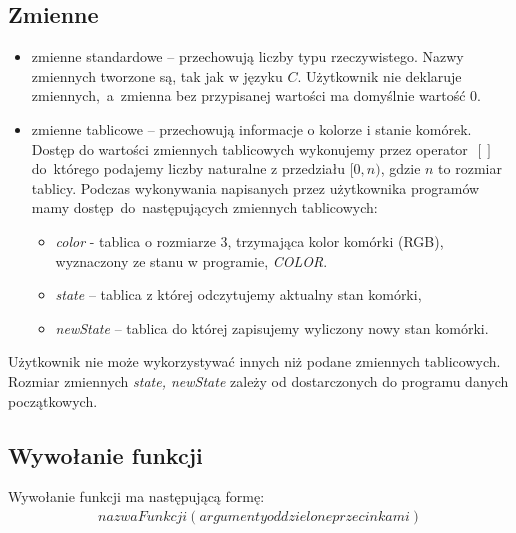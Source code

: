 \documentclass[declaration,shortabstract, inz]{iithesis}
\theoremstyle{definition} \newtheorem{definition}{Definicja}[]
\theoremstyle{plain} \newtheorem{remark}[definition]{Obserwacja}
\theoremstyle{plain} \newtheorem{theorem}[definition]{Twierdzenie}
\theoremstyle{plain} \newtheorem{example}{Przykład}[definition]
\theoremstyle{plain} \newtheorem{lemma}[definition]{Lemat}
\begin{document}
\subsection{Zmienne}
\begin{itemize}
\item zmienne standardowe -- przechowują liczby typu rzeczywistego. Nazwy zmiennych tworzone są, tak jak w języku $C$. Użytkownik nie deklaruje zmiennych,~a~zmienna bez przypisanej wartości ma domyślnie wartość $0$.
\item zmienne tablicowe -- przechowują informacje o kolorze i stanie komórek. Dostęp do wartości zmiennych tablicowych wykonujemy przez operator~$[]$~ do~którego podajemy liczby naturalne z przedziału $[0, n)$, gdzie $n$ to rozmiar tablicy. Podczas wykonywania napisanych przez użytkownika programów mamy dostęp~do~następujących zmiennych tablicowych: 
	\begin{itemize}
	\item \textit{color} - tablica o rozmiarze $3$, trzymająca kolor komórki (RGB), wyznaczony ze stanu w programie, \textit{COLOR}. 
	\item \textit{state} -- tablica z której odczytujemy aktualny stan komórki,
	\item \textit{newState} -- tablica do której zapisujemy wyliczony nowy stan komórki.
	\end{itemize}
\end{itemize}
Użytkownik nie może wykorzystywać innych niż podane zmiennych tablicowych. Rozmiar zmiennych \textit{state, newState} zależy od dostarczonych do programu danych początkowych. 

\subsection{Wywołanie funkcji}
Wywołanie funkcji ma następującą formę:
\begin{align}
nazwaFunkcji(argumenty oddzielone przecinkami)
\end{align}
\end{document}
